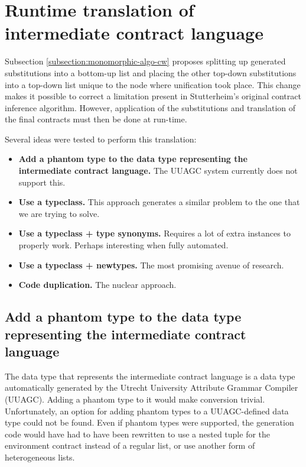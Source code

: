 \documentclass[10pt]{report}
\begin{document}
{\section{Runtime translation of intermediate contract language}
\label{futurework:runtimetranslation}

Subsection \ref{subsection:monomorphic-algo-cw} proposes splitting up generated substitutions into a bottom-up list and placing the other top-down substitutions into a top-down list unique to the node where unification took place.
This change makes it possible to correct a limitation present in Stutterheim's original contract inference algorithm.
However, application of the substitutions and translation of the final contracts must then be done at run-time.

Several ideas were tested to perform this translation:
\begin{itemize}
	\item \textbf{Add a phantom type to the data type representing the intermediate contract language.} The UUAGC system currently does not support this.
	\item \textbf{Use a typeclass.} This approach generates a similar problem to the one that we are trying to solve.
	\item \textbf{Use a typeclass + type synonyms.} Requires a lot of extra instances to properly work. Perhaps interesting when fully automated.
	\item \textbf{Use a typeclass + newtypes.} The most promising avenue of research.
	\item \textbf{Code duplication.} The nuclear approach.
\end{itemize}

\subsection{Add a phantom type to the data type representing the intermediate contract language}
The data type that represents the intermediate contract language is a data type automatically generated by the Utrecht University Attribute Grammar Compiler (UUAGC). 
Adding a phantom type to it would make conversion trivial.
Unfortunately, an option for adding phantom types to a UUAGC-defined data type could not be found.
Even if phantom types were supported, the generation code would have had to have been rewritten to use a nested tuple for the environment contract instead of a regular list, or use another form of heterogeneous lists.

}
\end{document}
